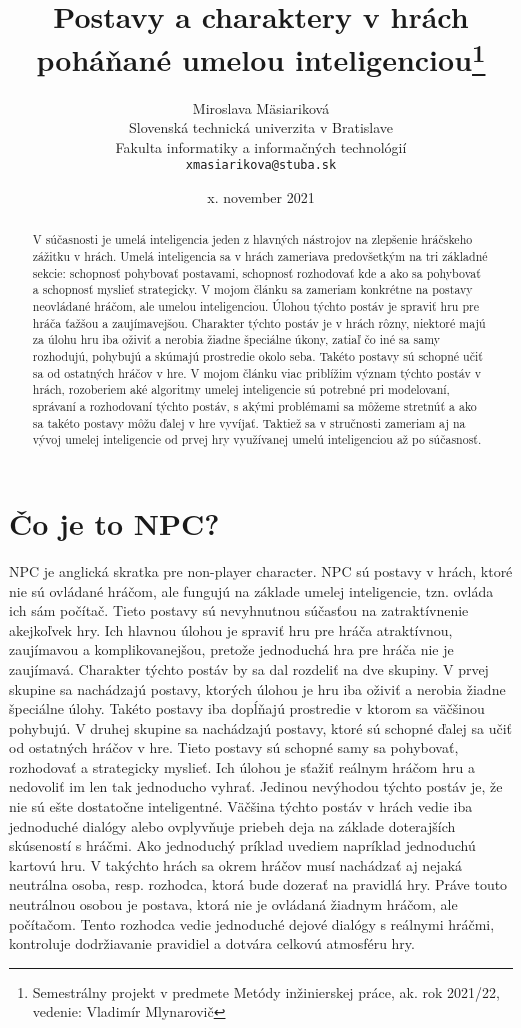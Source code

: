 \documentclass[10pt,twoside,slovak,a4paper]{article}
\title{Postavy a charaktery v hrách poháňané umelou inteligenciou\thanks{Semestrálny projekt v predmete Metódy inžinierskej práce, ak. rok 2021/22, vedenie: Vladimír Mlynarovič}} %
\author{Miroslava Mäsiariková\\[2pt]
	{\small Slovenská technická univerzita v Bratislave}\\
	{\small Fakulta informatiky a informačných technológií}\\
	{\small \texttt{xmasiarikova@stuba.sk}}
	}
\date{\small x. november 2021} %
\begin{document}
\maketitle

\begin{abstract}

V súčasnosti je umelá inteligencia jeden z hlavných nástrojov na zlepšenie hráčskeho zážitku v hrách. Umelá inteligencia sa v hrách zameriava predovšetkým na tri základné sekcie: schopnosť pohybovať postavami, schopnosť rozhodovať kde a ako sa pohybovať a schopnosť myslieť strategicky. V mojom článku sa zameriam konkrétne na postavy neovládané hráčom, ale umelou inteligenciou. Úlohou týchto postáv je spraviť hru pre hráča ťažšou a zaujímavejšou. Charakter týchto postáv je v hrách rôzny, niektoré majú za úlohu hru iba oživiť a nerobia žiadne špeciálne úkony, zatiaľ čo iné sa samy rozhodujú, pohybujú a skúmajú prostredie okolo seba. Takéto postavy sú schopné učiť sa od ostatných hráčov v hre. V mojom článku viac priblížim význam týchto postáv v hrách, rozoberiem aké algoritmy umelej inteligencie sú potrebné pri modelovaní, správaní a rozhodovaní týchto postáv, s akými problémami sa môžeme stretnúť a ako sa takéto postavy môžu ďalej v hre vyvíjať. Taktiež sa v stručnosti zameriam aj na vývoj umelej inteligencie od prvej hry využívanej umelú inteligenciou až po súčasnosť. 

\end{abstract}


\section{Čo je to NPC?}  \label{nejaka}
NPC je anglická skratka pre non-player character. NPC sú postavy v hrách, ktoré nie sú ovládané hráčom, ale fungujú na základe umelej inteligencie, tzn. ovláda ich sám počítač. Tieto postavy sú nevyhnutnou súčasťou na zatraktívnenie akejkoľvek hry. Ich hlavnou úlohou je spraviť hru pre hráča atraktívnou, zaujímavou a komplikovanejšou, pretože jednoduchá hra pre hráča nie je zaujímavá. Charakter týchto postáv by sa dal rozdeliť na dve skupiny. V prvej skupine sa nachádzajú postavy, ktorých úlohou je hru iba oživiť a nerobia žiadne špeciálne úlohy. Takéto postavy iba dopĺňajú prostredie v ktorom sa väčšinou pohybujú. V druhej skupine sa nachádzajú postavy, ktoré sú schopné ďalej sa učiť od ostatných hráčov v hre. Tieto postavy sú schopné samy sa pohybovať, rozhodovať a strategicky myslieť. Ich úlohou je sťažiť reálnym hráčom hru a nedovoliť im len tak jednoducho vyhrať. Jedinou nevýhodou týchto postáv je, že nie sú ešte dostatočne inteligentné. Väčšina týchto postáv v hrách vedie iba jednoduché dialógy alebo ovplyvňuje priebeh deja na základe doterajších skúseností s hráčmi. Ako jednoduchý príklad uvediem napríklad jednoduchú kartovú hru. V takýchto hrách sa okrem hráčov musí nachádzať aj nejaká neutrálna osoba, resp. rozhodca, ktorá bude dozerať na pravidlá hry. Práve touto neutrálnou osobou je postava, ktorá nie je ovládaná žiadnym hráčom, ale počítačom. Tento rozhodca vedie jednoduché dejové dialógy s reálnymi hráčmi, kontroluje dodržiavanie pravidiel a dotvára celkovú atmosféru hry. 
\begin{figure*}[tbh]
\centering
\end{figure*}
\end{document}
